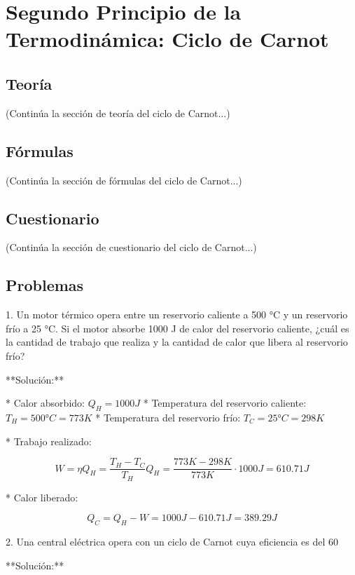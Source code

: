 \documentclass[../main]{subfiles}
\begin{document}
\chapter{Segundo Principio de la Termodinámica: Ciclo de Carnot}

\section{Teoría}

(Continúa la sección de teoría del ciclo de Carnot...)

\section{Fórmulas}

(Continúa la sección de fórmulas del ciclo de Carnot...)

\section{Cuestionario}

(Continúa la sección de cuestionario del ciclo de Carnot...)

\section{Problemas}

1. Un motor térmico opera entre un reservorio caliente a 500 °C y un reservorio frío a 25 °C. Si el motor absorbe 1000 J de calor del reservorio caliente, ¿cuál es la cantidad de trabajo que realiza y la cantidad de calor que libera al reservorio frío?

**Solución:**

* Calor absorbido: $Q_H = 1000 J$
* Temperatura del reservorio caliente: $T_H = 500 °C = 773 K$
* Temperatura del reservorio frío: $T_C = 25 °C = 298 K$

* Trabajo realizado:

$$
W = \eta Q_H = \frac{T_H - T_C}{T_H} Q_H = \frac{773 K - 298 K}{773 K} \cdot 1000 J = 610.71 J
$$

* Calor liberado:

$$
Q_C = Q_H - W = 1000 J - 610.71 J = 389.29 J
$$

2. Una central eléctrica opera con un ciclo de Carnot cuya eficiencia es del 60%

**Solución:**
\end{document}
